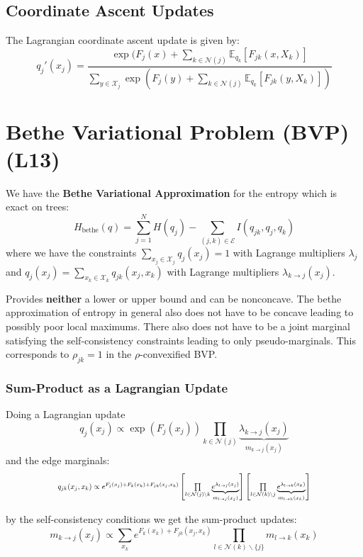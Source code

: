 \documentclass[9pt]{article}
\begin{document}
\begin{multicols}{2}
\subsection{Coordinate Ascent Updates}

The Lagrangian coordinate ascent update is given by:
$$q_{j}'(x_j)=\frac{\exp(F_j(x)+\sum_{k \in \mathcal{N}(j)}\mathbb{E}_{q_k}[F_{jk}(x,X_k)]}{\sum_{y \in \mathcal{X}_j} 
\exp(F_j(y)+\sum_{k \in \mathcal{N}(j)} \mathbb{E}_{q_k}[F_{jk}(y,X_k)])}$$
\section{Bethe Variational Problem (BVP) (L13)}

We have the \textbf{Bethe Variational Approximation} for the
entropy which is exact on trees:
$$H_{\text{bethe}}(q)=\sum_{j=1}^{N}H(q_j)-\sum_{(j,k) \in \mathcal{E}} I(q_{jk},q_j,q_k)$$
where we have the constraints $\sum_{x_j \in \mathcal{X}_j}q_j(x_j)=1$ with Lagrange multipliers $\lambda_j$ and $q_j(x_j)=\sum\limits_{x_k \in \mathcal{X}_k}q_{jk}(x_j,x_k)$ with 
Lagrange multipliers $\lambda_{k \to j}(x_j)$.

Provides \textbf{neither} a lower or upper bound and can be nonconcave. The bethe approximation of entropy in general also does not have to be concave leading to possibly poor local maximums. There also does not have to be a joint marginal satisfying the
self-consistency constraints leading to only pseudo-marginals. This
corresponds to $\rho_{jk}=1$ in the $\rho$-convexified BVP.

\subsubsection{Sum-Product as a Lagrangian Update}

Doing a Lagrangian update $$q_{j}(x_j) \propto \exp(F_j(x_j))\prod_{k \in \mathcal{N}(j)}\underbrace{\lambda_{k \to j}(x_j)}_{m_{k \to j}(x_j)}$$
and the edge marginals:
\[
\scalebox{0.75}{
\(
q_{jk}(x_j,x_k) \propto e^{F_j(x_j)+F_k(x_k)+F_{jk}(x_j,x_k)}
\left[\prod\limits_{l \in \mathcal{N}(j)\backslash k} \underbrace{e^{\lambda_{l \to j}(x_j)}}_{m_{l \to j}(x_j)}\right]
\left[\prod\limits_{l \in \mathcal{N}(k) \backslash j} \underbrace{e^{\lambda_{l \to k}(x_k)}}_{m_{l \to k}(x_k)}\right]
\)
} \]

by the self-consistency conditions we get the sum-product updates:
$$m_{k \to j}(x_j) \propto \sum\limits_{x_k}e^{F_k(x_k)+F_{jk}(x_j,x_k)} \prod\limits_{l \in \mathcal{N}(k)\backslash \{j\}} 
m_{l \to k}(x_k)$$


\end{multicols}
\end{document}
